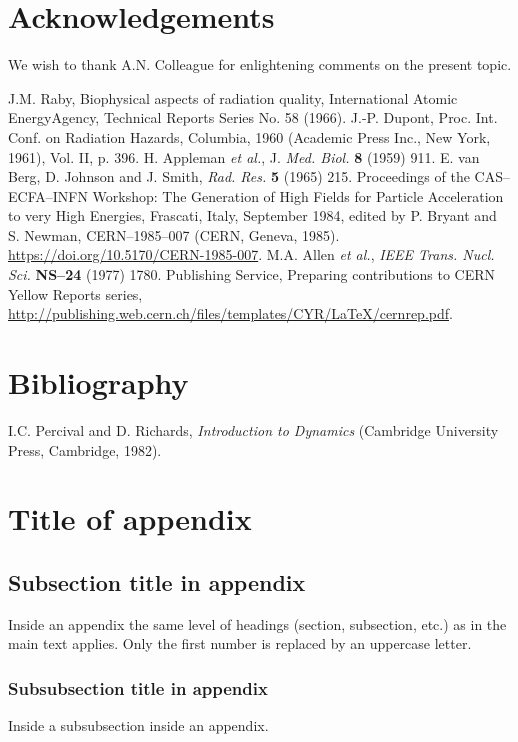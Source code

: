 \documentclass{cernrep}
\begin{document}
\section*{Acknowledgements}

We wish to thank A.N. Colleague for enlightening comments on
the present topic.

\begin{thebibliography}{99}
J.M. Raby, Biophysical aspects of radiation quality, International 
Atomic EnergyAgency, Technical Reports Series No. 58 (1966).
J.-P. Dupont, Proc. Int. Conf. on Radiation Hazards, Columbia, 
1960 (Academic Press Inc., New York, 1961), Vol. II, p. 396.
H. Appleman \emph{et al.}, J. \emph{Med. Biol.} \textbf{8} (1959) 911.
E. van Berg, D. Johnson and J. Smith, \emph{Rad. Res.} \textbf{5} (1965) 
215.
Proceedings of the CAS--ECFA--INFN Workshop: The Generation of High Fields for Particle Acceleration to very High Energies, Frascati, Italy, September 1984, edited by P. Bryant and S. Newman, CERN--1985--007 (CERN, Geneva, 1985).\\
\url{https://doi.org/10.5170/CERN-1985-007}.
M.A. Allen \emph{et al.}, \emph{IEEE Trans. Nucl. Sci.} \textbf{NS--24} (1977) 
1780.
Publishing Service, Preparing contributions to CERN Yellow Reports series,\\
\url{http://publishing.web.cern.ch/files/templates/CYR/LaTeX/cernrep.pdf}.
\end{thebibliography}

\section*{Bibliography}


I.C. Percival and D. Richards, \emph{Introduction to Dynamics}
(Cambridge University Press, Cambridge, 1982).

\appendix
\section{Title of appendix}
\label{sec:app}

\subsection{Subsection title in appendix}

Inside an appendix the same level of headings (section, subsection,
etc.) as in the main text applies. Only the first number is replaced
by an uppercase letter.

\subsubsection{Subsubsection title in appendix}

Inside a subsubsection inside an appendix.

\end{document}
